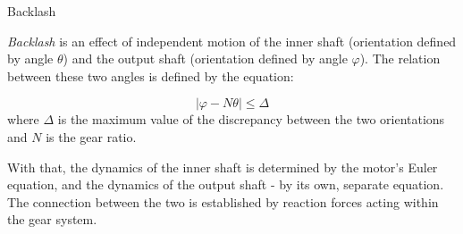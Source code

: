 \documentclass{beamer}
\begin{document}
\begin{frame}{Backlash}
	\begin{flushleft}
		
		\emph{Backlash} is an effect of independent motion of the inner shaft (orientation defined by angle $\theta$) and the output shaft (orientation defined by angle $\varphi$). The relation between these two angles is defined by the equation:
		
		\begin{equation}
			|\varphi - N \theta| \leq \Delta
		\end{equation}
	where $\Delta$ is the maximum value of the discrepancy between the two orientations and $N$ is the gear ratio.
	
	\bigskip
	
	With that, the dynamics of the inner shaft is determined by the motor's Euler equation, and the  dynamics of the output shaft - by its own, separate equation. The connection between the two is established by reaction forces acting within the gear system.
	
	\end{flushleft}
\end{frame}

\myqrframe
\end{document}
